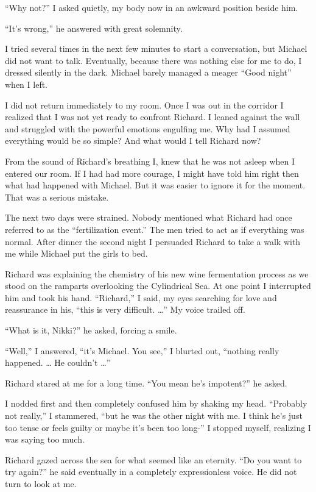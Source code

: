 \documentclass[]{article}
\begin{document}
“Why not?” I asked quietly, my body now in an awkward position beside him.

“It’s wrong,” he answered with great solemnity.

I tried several times in the next few minutes to start a conversation, but Michael did not want to talk. Eventually, because there was nothing else for me to do, I dressed silently in the dark. Michael barely managed a meager “Good night” when I left.

I did not return immediately to my room. Once I was out in the corridor I realized that I was not yet ready to confront Richard. I leaned against the wall and struggled with the powerful emotions engulfing me. Why had I assumed everything would be so simple? And what would I tell Richard now?

From the sound of Richard’s breathing I, knew that he was not asleep when I entered our room. If I had had more courage, I might have told him right then what had happened with Michael. But it was easier to ignore it for the moment. That was a serious mistake.

The next two days were strained. Nobody mentioned what Richard had once referred to as the “fertilization event.” The men tried to act as if everything was normal. After dinner the second night I persuaded Richard to take a walk with me while Michael put the girls to bed.

Richard was explaining the chemistry of his new wine fermentation process as we stood on the ramparts overlooking the Cylindrical Sea. At one point I interrupted him and took his hand. “Richard,” I said, my eyes searching for love and reassurance in his, “this is very difficult. …” My voice trailed off.

“What is it, Nikki?” he asked, forcing a smile.

“Well,” I answered, “it’s Michael. You see,” I blurted out, “nothing really happened. … He couldn’t …”

Richard stared at me for a long time. “You mean he’s impotent?” he asked.

I nodded first and then completely confused him by shaking my head. “Probably not really,” I stammered, “but he was the other night with me. I think he’s just too tense or feels guilty or maybe it’s been too long-” I stopped myself, realizing I was saying too much.

Richard gazed across the sea for what seemed like an eternity. “Do you want to try again?” he said eventually in a completely expressionless voice. He did not turn to look at me.
\end{document}
